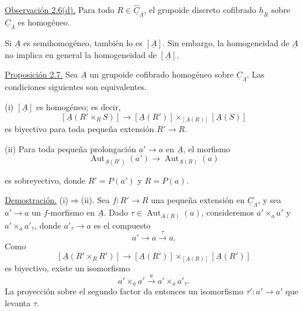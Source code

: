 \underline{Observación 2.6(d).} Para todo
$R\in\widehat{\underline C}_\Lambda$, el grupoide discreto cofibrado
$\underline h_R$ sobre $\underline C_\Lambda$ es homogéneo.

Si $\underline A$ es semihomogéneo, también lo es $[\underline A]$.
Sin embargo, la homogeneidad de $\underline A$ no implica en general
la homogeneidad de $[\underline A]$.

\underline{Proposición 2.7.} Sea $\underline A$ un grupoide cofibrado
homogéneo sobre $\underline C_\Lambda$. Las condiciones siguientes son
equivalentes.

(i) $[\underline A]$ es homogéneo; es decir,
\[
 [\underline A(R'\times_RS)]\longrightarrow
 [\underline A(R')]
 \times_{[\underline A(R)]}[\underline A(S)]
\]
es biyectivo para toda pequeña extensión $R'\longrightarrow R$.

(ii) Para toda pequeña prolongación $a'\longrightarrow a$ en
$\underline A$, el morfismo
\[
 \operatorname{Aut}_{\underline A(R')}(a')
 \longrightarrow
 \operatorname{Aut}_{\underline A(R)}(a)
\]


es sobreyectivo, donde $R'=P(a')$ y $R=P(a)$.

\underline{Demostración.} (i)$\Rightarrow$(ii). Sea
$f:R'\longrightarrow R$ una pequeña extensión en
$\underline C_\Lambda$, y sea $a'\longrightarrow a$ un $f$-morfismo
en $\underline A$. Dado
$\tau\in\operatorname{Aut}_{\underline A(R)}(a)$, consideremos
$a'\times_a a'$ y $a'\times_a a'_\tau$, donde
$a'_\tau\longrightarrow a$ es el compuesto
\[
 a'\longrightarrow a\xrightarrow{\ \tau\ }a.
\]
Como
\[
 [\underline A(R'\times_RR')]
 \longrightarrow
 [\underline A(R')]
 \times_{[\underline A(R)]}[\underline A(R')]
\]
es biyectivo, existe un isomorfismo
\[
 a'\times_a a'\xrightarrow{\ u\ }a'\times_a a'_\tau.
\]
La proyección sobre el segundo factor da entonces un isomorfismo
$\tau':a'\longrightarrow a'$ que levanta $\tau$.

